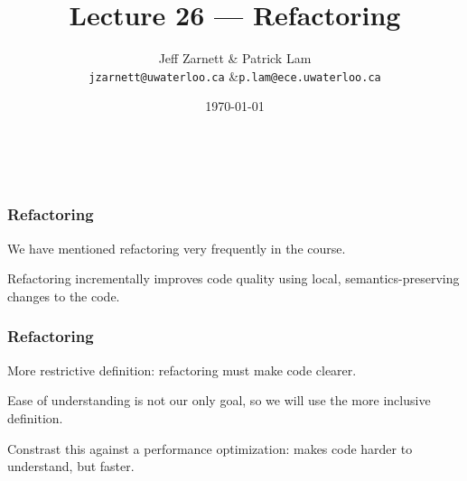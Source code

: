 
\usepackage{tikz-3dplot}

\title{Lecture 26 --- Refactoring}

\author{Jeff Zarnett \& Patrick Lam \\ \small \texttt{jzarnett@uwaterloo.ca} \&\texttt{p.lam@ece.uwaterloo.ca}}
\date{\today}



\begin{frame}
  \titlepage

  \vfill
  \begin{center}
    \\
                  {\tiny\CcNote{\CcLongnameByNcSa}}
                  \vspace*{-2.5ex}
  \end{center}

\end{frame}


\begin{frame}
\frametitle{Refactoring}
\begin{changemargin}{1cm}

We have mentioned refactoring very frequently in the course.

\alert{Refactoring} incrementally improves code quality using local, semantics-preserving changes to the code.

\end{changemargin}
\end{frame}

\begin{frame}
\frametitle{Refactoring}
\begin{changemargin}{1cm}

More restrictive definition: refactoring must make code clearer.

Ease of understanding is not our only goal, so we will use the more inclusive definition.

Constrast this against a performance optimization: makes code harder to understand, but faster.

\end{changemargin}
\end{frame}


